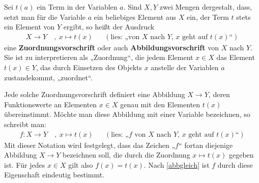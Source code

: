 \begin{nota} \label{def:zuordnung}  
    Sei $t(a)$ ein Term in der Variablen $a$. Sind $X,Y$ zwei Mengen dergestalt, dass, setzt man für die Variable $a$ ein beliebiges Element aus $X$ ein, der Term $t$ stets ein Element von $Y$ ergibt, so heißt der Ausdruck
    \begin{align*}
        X \to Y \ &,\ x\mapsto t(x) && (\text{lies: „von $X$ nach $Y$, $x$ geht auf $t(x)$“})
    \end{align*}
    eine \textbf{Zuordnungsvorschrift} oder auch \textbf{Abbildungsvorschrift} von $X$ nach $Y$. Sie ist zu interpretieren als „Zuordnung“, die jedem Element $x\in X$ das Element $t(x)\in Y$, das durch Einsetzen des Objekts $x$ anstelle der Variablen $a$ zustandekommt, „zuordnet“.
    
    Jede solche Zuordnungsvorschrift definiert eine Abbildung $X\to Y$, deren Funktionswerte an Elementen $x\in X$ genau mit den Elementen $t(x)$ übereinstimmt. Möchte man diese Abbildung mit einer Variable bezeichnen, so schreibt man:
    \begin{align*}
        f : X\to Y \ & ,\ x\mapsto t(x) && (\text{lies: „$f$ von $X$ nach $Y$, $x$ geht auf $t(x)$“})
    \end{align*}
    Mit dieser Notation wird festgelegt, dass das Zeichen „$f$“ fortan diejenige Abbildung $X\to Y$ bezeichnen soll, die durch die Zuordnung $x\mapsto t(x)$ gegeben ist. Für jedes $x\in X$ gilt also $f(x)=t(x)$. Nach \cref{abbgleich} ist $f$ durch diese Eigenschaft eindeutig bestimmt.
\end{nota}


